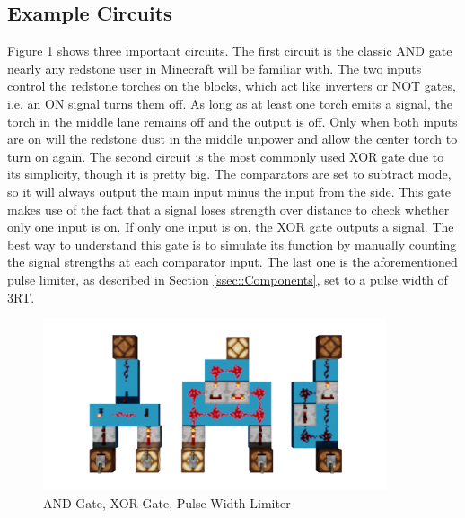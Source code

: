 \subsection{Example Circuits} \label{ssec::ExampleCircuits}
Figure \ref{fig::ExampleCircuits} shows three important circuits. The first circuit is the classic AND gate nearly any redstone user in Minecraft will be familiar with. The two inputs control the redstone torches on the blocks, which act like inverters or NOT gates, i.e. an ON signal turns them off. As long as at least one torch emits a signal, the torch in the middle lane remains off and the output is off. Only when both inputs are on will the redstone dust in the middle unpower and allow the center torch to turn on again. The second circuit is the most commonly used XOR gate due to its simplicity, though it is pretty big. The comparators are set to subtract mode, so it will always output the main input minus the input from the side. This gate makes use of the fact that a signal loses strength over distance to check whether only one input is on. If only one input is on, the XOR gate outputs a signal. The best way to understand this gate is to simulate its function by manually counting the signal strengths at each comparator input. The last one is the aforementioned pulse limiter, as described in Section \ref{ssec::Components}, set to a pulse width of 3RT.

\begin{figure}[h]
    \begin{center}
        \includegraphics[width=0.9\textwidth]{Figures/ExampleCircuits.png}
        \caption{AND-Gate, XOR-Gate, Pulse-Width Limiter}
        \label{fig::ExampleCircuits}
    \end{center}
\end{figure}


